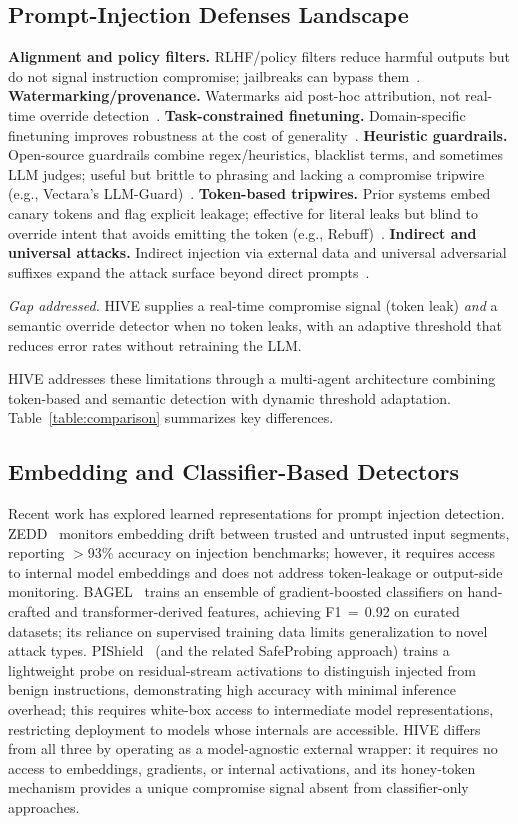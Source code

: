 \documentclass[manuscript,screen,review]{acmart}
\begin{document}
\subsection{Prompt-Injection Defenses Landscape}
\textbf{Alignment and policy filters.} RLHF/policy filters reduce harmful outputs but do not signal instruction compromise; jailbreaks can bypass them~\cite{b3,b1}. 
\textbf{Watermarking/provenance.} Watermarks aid post-hoc attribution, not real-time override detection~\cite{b2}.
\textbf{Task-constrained finetuning.} Domain-specific finetuning improves robustness at the cost of generality~\cite{b8}.
\textbf{Heuristic guardrails.} Open-source guardrails combine regex/heuristics, blacklist terms, and sometimes LLM judges; useful but brittle to phrasing and lacking a compromise tripwire (e.g., Vectara's LLM-Guard)~\cite{b14}.
\textbf{Token-based tripwires.} Prior systems embed canary tokens and flag explicit leakage; effective for literal leaks but blind to override intent that avoids emitting the token (e.g., Rebuff)~\cite{b13}.
\textbf{Indirect and universal attacks.} Indirect injection via external data and universal adversarial suffixes expand the attack surface beyond direct prompts~\cite{b6,b1}.

\noindent\emph{Gap addressed.} HIVE supplies a real-time compromise signal (token leak) \emph{and} a semantic override detector when no token leaks, with an adaptive threshold that reduces error rates without retraining the LLM.


HIVE addresses these limitations through a multi-agent architecture combining token-based and semantic detection with dynamic threshold adaptation. Table~\ref{table:comparison} summarizes key differences.

\subsection{Embedding and Classifier-Based Detectors}
Recent work has explored learned representations for prompt injection detection. ZEDD~\cite{zedd2024} monitors embedding drift between trusted and untrusted input segments, reporting $>$93\% accuracy on injection benchmarks; however, it requires access to internal model embeddings and does not address token-leakage or output-side monitoring. BAGEL~\cite{bagel2024} trains an ensemble of gradient-boosted classifiers on hand-crafted and transformer-derived features, achieving F1\,$=$\,0.92 on curated datasets; its reliance on supervised training data limits generalization to novel attack types. PIShield~\cite{pishield2024} (and the related SafeProbing approach) trains a lightweight probe on residual-stream activations to distinguish injected from benign instructions, demonstrating high accuracy with minimal inference overhead; this requires white-box access to intermediate model representations, restricting deployment to models whose internals are accessible. HIVE differs from all three by operating as a model-agnostic external wrapper: it requires no access to embeddings, gradients, or internal activations, and its honey-token mechanism provides a unique compromise signal absent from classifier-only approaches.
\end{document}
